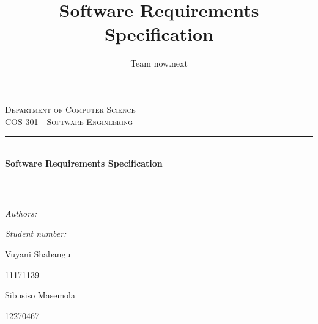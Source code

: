\documentclass{article}
\author{Team now.next}
\title{ Software Requirements Specification}
\newcommand{\HRule}{\rule{\linewidth}{0.5mm}}
\begin{document}
	\setlength{\parskip}{6pt}
	
	\begin{titlepage}
		
		\begin{center}
		
			\textsc{\LARGE Department of Computer Science}\\[1.5cm]
			\textsc{\Large COS 301 - Software Engineering}\\[0.5cm]
			\HRule \\[0.4cm]
			{ \huge \bfseries Software Requirements Specification}\\[0.4cm]
			\HRule \\[0.4cm]
			\begin{minipage}{0.4\textwidth}
				\begin{flushleft} \large
					\emph{Authors:}
				\end{flushleft}
			\end{minipage}
			\begin{minipage}{0.4\textwidth}
				\begin{flushright} \large
					\emph{Student number:}
				\end{flushright}
			\end{minipage}
			
			\begin{minipage}{0.4\textwidth}
				\begin{flushleft} \large
					Vuyani {Shabangu}
				\end{flushleft}
			\end{minipage}
			\begin{minipage}{0.4\textwidth}
				\begin{flushright} \large
					\emph{}
					11171139
				\end{flushright}
			\end{minipage}
			
			\begin{minipage}{0.4\textwidth}
				\begin{flushleft} \large
					Sibusiso {Masemola}
				\end{flushleft}
			\end{minipage}
			\begin{minipage}{0.4\textwidth}
				\begin{flushright} \large
					\emph{}
					12270467
				\end{flushright}
			\end{minipage}
			

\end{center}
\end{titlepage}
\end{document}
